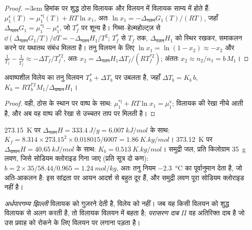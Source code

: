 \begin{proof}\emergencystretch=3em
हिमांक पर शुद्ध ठोस विलायक और विलयन में विलायक
साम्य में होते हैं: $\mu_1^{\text{s}}(T) = \mu_1^{*\text{l}}(T) + RT\ln x_1$, अतः
$\ln x_1 = -\Delta_{\text{गलन}}G_1(T)/(RT)$, जहाँ $\Delta_{\text{गलन}}G_1 =
\mu_1^{*\text{l}} - \mu_1^{\text{s}}$, जो $T_f^*$ पर शून्य है। गिब्स--हेल्महोल्ट्ज़ से
$\dd(\Delta_{\text{गलन}}G_1/T)/\dd T = -\Delta_{\text{गलन}}H_1/T^2$;
$T_f^*$ से $T_f$ तक, $\Delta_{\text{गलन}}H_1$ को स्थिर रखकर, समाकलन करने पर
यथातथ संबंध मिलता है। तनु विलयन के लिए $\ln x_1 = \ln(1 - x_2) \approx
-x_2$ और $\frac1{T_f} - \frac1{T_f^*} \approx -\Delta T_f/T_f^{*2}$, अतः
$x_2 = \Delta_{\text{गलन}}H_1\Delta T_f/(RT_f^{*2})$; अंततः $x_2 \approx
n_2/n_1 = b\,M_1$।
\end{proof}

\begin{proposition}\label{prop:b2:chemical-potential:ebullioscopy}
अवाष्पशील विलेय का तनु विलयन $T_b^* + \Delta T_b$ पर उबलता है, जहाँ
$\Delta T_b = K_b\,b$, $K_b = RT_b^{*2}M_1/\Delta_{\text{वाष्पन}}H_1$।
\end{proposition}

\begin{proof}
वही, ठोस के स्थान पर वाष्प के साथ: $\mu_1^{*\text{l}} +
RT\ln x_1 = \mu_1^{\text{v}}$; विलायक की रेखा नीचे आती है, और अब वह
वाष्प की रेखा से उच्चतर ताप पर मिलती है।
\end{proof}

\begin{example}[जल]\label{ex:b2:chemical-potential:water-constants}
\qty{273.15}{K} पर $\Delta_{\text{गलन}}H = \qty{333.4}{J/g} = \qty{6.007}{kJ/mol}$
के साथ: $K_f = 8.314 \times 273.15^2 \times 0.018015/6007 =
\qty{1.86}{K.kg/mol}$। \qty{373.12}{K} पर $\Delta_{\text{वाष्पन}}H = \qty{40.65}{kJ/mol}$
के साथ: $K_b = \qty{0.513}{K.kg/mol}$। समुद्री जल, प्रति किलोग्राम \qty{35}{g} लवण,
जिसे सोडियम क्लोराइड गिना जाए (प्रति सूत्र दो कण):
$b = 2 \times 35/58.44/0.965 = \qty{1.24}{mol/kg}$, अतः तनु नियम
\qty{-2.3}{\celsius} का पूर्वानुमान देता है, जो अति-आकलन है: इस सांद्रता पर
आयन आदर्श से बहुत दूर हैं, और समुद्री लवण पूरा सोडियम क्लोराइड नहीं है।
\end{example}

\begin{definition}\label{def:b2:chemical-potential:osmotic-pressure}
\emph{अर्धपारगम्य झिल्ली} विलायक को
गुज़रने देती है, विलेय को नहीं। जब यह किसी विलयन को
शुद्ध विलायक से अलग करती है, तो विलायक विलयन में बहता है; \emph{परासरण
दाब} $\Pi$ वह अतिरिक्त दाब है जो उस प्रवाह को रोकने के लिए
विलयन पर लगाना पड़ता है।
\end{definition}


